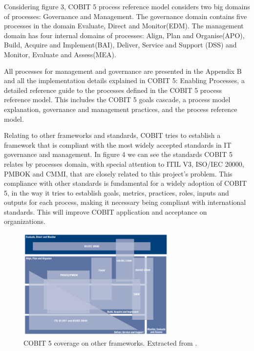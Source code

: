 Considering figure 3, COBIT 5 process reference model considers two big domains of processes: Governance and Management. The governance domain contains five processes in the domain Evaluate, Direct and Monitor(EDM). The management domain has four internal domains of processes: Align, Plan and Organise(APO), Build, Acquire and Implement(BAI), Deliver, Service and Support (DSS) and Monitor, Evaluate and Assess(MEA).\par
All processes for management and governance are presented in the Appendix B and all the implementation details explained in COBIT 5: Enabling Processes\cite{2012cobitEP}, a detailed reference guide to the processes defined in the COBIT 5 process reference model. This includes the COBIT 5 goals cascade, a process model explanation, governance and management practices, and the process reference model.\par
Relating to other frameworks and standards, COBIT tries to establish a framework that is compliant with the most widely accepted standards in IT governance and management. In figure 4 we can see the standards COBIT 5 relates by processes domain, with special attention to ITIL V3\cite{itilSS,itilSD,itilSO,itilST,itilCSI}, ISO/IEC 20000\cite{ISO20000-1}, PMBOK\cite{pmbok5} and CMMI\cite{cmmi}, that are closely related to this project's problem. This compliance with other standards is fundamental for a widely adoption of COBIT 5, in the way it tries to establish goals, metrics, practices, roles, inputs and outputs for each process, making it necessary being compliant with international standards. This will improve COBIT application and acceptance on organizations.\par

\begin{figure}[h!]
\centering
\includegraphics[width=0.7\textwidth]{img/COBITOtherFrameworks.png}
\caption{COBIT 5 coverage on other frameworks. Extracted from \cite{2012cobit}.}
\end{figure}


